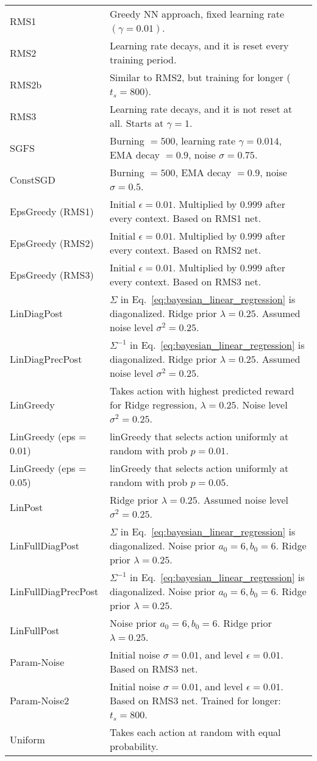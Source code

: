 \documentclass{article} \usepackage{iclr2018_conference,times}
\begin{document}
\begin{table}[ht]
\begin{tabular}{ll}
RMS1 & Greedy NN approach, fixed learning rate $(\gamma = 0.01)$. \\
RMS2 & Learning rate decays, and it is reset every training period. \\
RMS2b & Similar to RMS2, but training for longer ($t_s = 800$). \\
RMS3 & Learning rate decays, and it is not reset at all. Starts at $\gamma = 1$. \\
SGFS & Burning $= 500$, learning rate $\gamma = 0.014$, EMA decay $= 0.9$, noise $\sigma = 0.75$. \\
ConstSGD & Burning $= 500$, EMA decay $= 0.9$, noise $\sigma = 0.5$. \\
EpsGreedy (RMS1) & Initial $\epsilon = 0.01$. Multiplied by $0.999$ after every context. Based on RMS1 net. \\
EpsGreedy (RMS2) & Initial $\epsilon = 0.01$. Multiplied by $0.999$ after every context. Based on RMS2 net. \\
EpsGreedy (RMS3) & Initial $\epsilon = 0.01$. Multiplied by $0.999$ after every context. Based on RMS3 net. \\
LinDiagPost & $\Sigma$ in Eq.~\ref{eq:bayesian_linear_regression} is diagonalized.  Ridge prior $\lambda = 0.25$. Assumed noise level $\sigma^2 = 0.25$. \\
LinDiagPrecPost & $\Sigma^{-1}$ in Eq.~\ref{eq:bayesian_linear_regression} is diagonalized.  Ridge prior $\lambda = 0.25$. Assumed noise level $\sigma^2 = 0.25$. \\
LinGreedy & Takes action with highest predicted reward for Ridge regression, $\lambda = 0.25$. Noise level $\sigma^2 = 0.25$. \\
LinGreedy (eps = 0.01) & linGreedy that selects action uniformly at random with prob $p=0.01$. \\
LinGreedy (eps = 0.05) & linGreedy that selects action uniformly at random with prob $p=0.05$. \\
LinPost & Ridge prior $\lambda = 0.25$. Assumed noise level $\sigma^2 = 0.25$. \\
LinFullDiagPost & $\Sigma$ in Eq.~\ref{eq:bayesian_linear_regression} is diagonalized. Noise prior $a_0 = 6, b_0 = 6$. Ridge prior $\lambda = 0.25$. \\
LinFullDiagPrecPost & $\Sigma^{-1}$ in Eq.~\ref{eq:bayesian_linear_regression} is diagonalized. Noise prior $a_0 = 6, b_0 = 6$. Ridge prior $\lambda = 0.25$. \\
LinFullPost & Noise prior $a_0 = 6, b_0 = 6$. Ridge prior $\lambda = 0.25$. \\
Param-Noise & Initial noise $\sigma = 0.01$, and level $\epsilon = 0.01$. Based on RMS3 net.  \\
Param-Noise2 & Initial noise $\sigma = 0.01$, and level $\epsilon = 0.01$. Based on RMS3 net. Trained for longer: $t_s = 800$. \\
Uniform & Takes each action at random with equal probability. \\
    \bottomrule
  \end{tabular}
\end{table}
\end{document}
